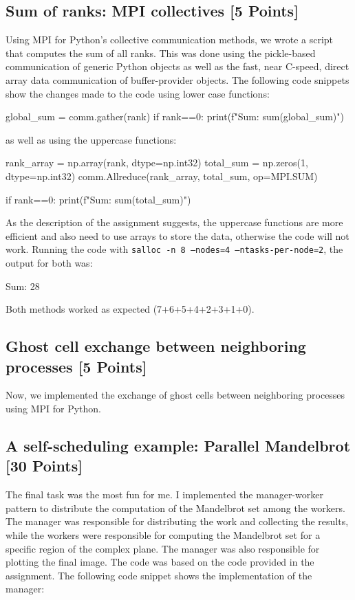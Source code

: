 \documentclass[unicode,11pt,a4paper,oneside,numbers=endperiod,openany]{scrartcl}
\begin{document}
\subsection{Sum of ranks: MPI collectives [5 Points]}

Using MPI for Python's collective communication methods, we wrote a script that
computes the sum of all ranks. 
This was done using the pickle-based communication of generic Python objects as
well as the fast, near C-speed, direct array data communication of
buffer-provider objects.
The following code snippets show the changes made to the code using lower case functions:
\begin{pythonverbatim}
    global_sum = comm.gather(rank)
    if rank==0:
    print(f"Sum: {sum(global_sum)}")
\end{pythonverbatim}
as well as using the uppercase functions:
\begin{pythonverbatim}
    rank_array = np.array(rank, dtype=np.int32)
    total_sum = np.zeros(1, dtype=np.int32)
    comm.Allreduce(rank_array, total_sum, op=MPI.SUM)
    
    if rank==0:
    print(f"Sum: {sum(total_sum)}")
\end{pythonverbatim}
As the description of the assignment suggests, the uppercase functions are more
efficient and also need to use arrays to store the data, otherwise the code will not work.
Running the code with \texttt{salloc -n 8 --nodes=4 --ntasks-per-node=2}, the
output for both was:
\begin{grayverbatim}
Sum: 28
\end{grayverbatim}
Both methods worked as expected (7+6+5+4+2+3+1+0).

\subsection{Ghost cell exchange between neighboring processes [5 Points]}
Now, we implemented the exchange of ghost cells between neighboring processes
using MPI for Python.


\subsection{A self-scheduling example: Parallel Mandelbrot [30 Points]}
The final task was the most fun for me. I implemented the manager-worker pattern
to distribute the computation of the Mandelbrot set among the workers. The
manager was responsible for distributing the work and collecting the results,
while the workers were responsible for computing the Mandelbrot set for a
specific region of the complex plane. The manager was also responsible for
plotting the final image. The code was based on the code provided in the
assignment. The following code snippet shows the implementation of the manager:
\end{document}
